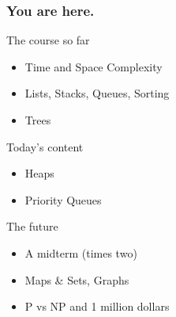 \begin{frame}
	\frametitle{You are here.}
	\begin{block}{The course so far}
		\begin{itemize}
			\item Time and Space Complexity
			\item Lists, Stacks, Queues, Sorting
			\item Trees
		\end{itemize}
	\end{block}
	\pause
	\begin{exampleblock}{Today's content}
		\begin{itemize}
			\item Heaps
			\item Priority Queues
		\end{itemize}
	\end{exampleblock}
	\pause
	\begin{block}{The future}
		\begin{itemize}
			\item A midterm (times two)
			\item Maps \& Sets, Graphs
			\item P vs NP and 1 million dollars
		\end{itemize}
	\end{block}
\end{frame}
